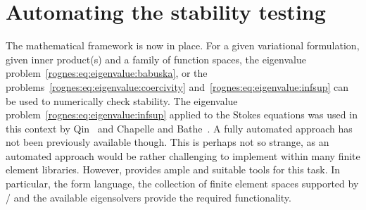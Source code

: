 


\section{Automating the stability testing}
\label{rognes:sec:automation}

The mathematical framework is now in place. For a given variational
formulation, given inner product(s) and a family of function spaces,
the eigenvalue problem~\eqref{rognes:eq:eigenvalue:babuska}, or the
problems~\eqref{rognes:eq:eigenvalue:coercivity}
and~\eqref{rognes:eq:eigenvalue:infsup} can be used to numerically check
stability. The eigenvalue problem~\eqref{rognes:eq:eigenvalue:infsup} applied
to the Stokes equations was used in this context by
Qin~\cite{Qin1994} and Chapelle and
Bathe~\cite{ChapelleBathe1993}. A fully automated approach has not
been previously available though. This is perhaps not so strange, as
an automated approach would be rather challenging to implement within
many finite element libraries. However, \pydolfin{} provides ample and
suitable tools for this task. In particular, the \ufl{} form language,
the collection of finite element spaces supported by \fiat{}/\ffc{}
and the available \slepc{} eigensolvers provide the required
functionality.

